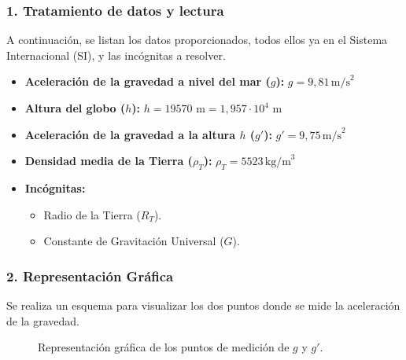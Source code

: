 \subsubsection*{1. Tratamiento de datos y lectura}
A continuación, se listan los datos proporcionados, todos ellos ya en el Sistema Internacional (SI), y las incógnitas a resolver.
\begin{itemize}
    \item \textbf{Aceleración de la gravedad a nivel del mar ($g$):} $g = 9,81 \, \text{m/s}^2$
    \item \textbf{Altura del globo ($h$):} $h = 19570 \text{ m} = 1,957 \cdot 10^4 \text{ m}$
    \item \textbf{Aceleración de la gravedad a la altura $h$ ($g'$):} $g' = 9,75 \, \text{m/s}^2$
    \item \textbf{Densidad media de la Tierra ($\rho_T$):} $\rho_T = 5523 \, \text{kg/m}^3$
    \item \textbf{Incógnitas:}
    \begin{itemize}
        \item Radio de la Tierra ($R_T$).
        \item Constante de Gravitación Universal ($G$).
    \end{itemize}
\end{itemize}

\subsubsection*{2. Representación Gráfica}
Se realiza un esquema para visualizar los dos puntos donde se mide la aceleración de la gravedad.
\begin{figure}[H]
    \centering
    \caption{Representación gráfica de los puntos de medición de $g$ y $g'$.}
\end{figure}

